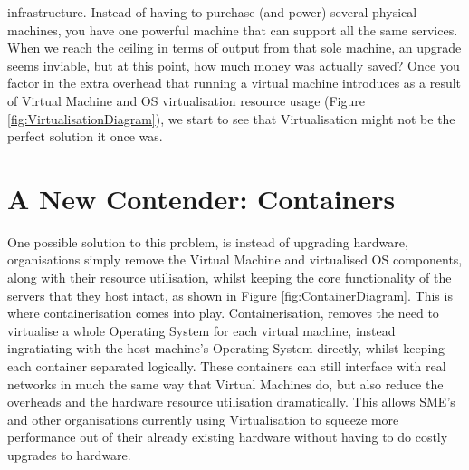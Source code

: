 infrastructure. Instead of having to purchase (and power) several physical machines, you have one powerful machine that can support all the same services. When we reach the ceiling in terms of output from that sole machine, an upgrade seems inviable, but at this point, how much money was actually saved? Once you factor in the extra overhead that running a virtual machine introduces as a result of Virtual Machine and OS virtualisation resource usage (Figure \ref{fig:VirtualisationDiagram}), we start to see that Virtualisation might not be the perfect solution it once was.



\section{A New Contender: Containers}
\label{IntroContainer}
One possible solution to this problem, is instead of upgrading hardware, organisations simply remove the Virtual Machine and virtualised OS components, along with their resource utilisation, whilst keeping the core functionality of the servers that they host intact, as shown in Figure \ref{fig:ContainerDiagram}. This is where containerisation comes into play. Containerisation, removes the need to virtualise a whole Operating System for each virtual machine, instead ingratiating with the host machine's Operating System directly, whilst keeping each container separated logically. These containers can still interface with real networks in much the same way that Virtual Machines do, but also reduce the overheads and the hardware resource utilisation dramatically. This allows SME's and other organisations currently using Virtualisation to squeeze more performance out of their already existing hardware without having to do costly upgrades to hardware.

